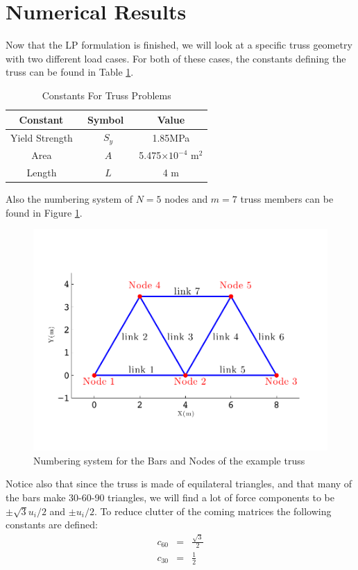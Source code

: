 \documentclass[12pt]{article}
\begin{document}
\section{Numerical Results}
Now that the LP formulation is finished, we will look at a specific truss geometry with two different load cases.  For both of these cases, the constants defining the truss can be found in Table \ref{tab:Constants}.
\begin{table}[htb!]
\caption{Constants For Truss Problems}
\label{tab:Constants}
\begin{center}
  \begin{tabular}{@{} |c|c|c| @{}}
    \hline
     Constant\ & Symbol\ & Value\\
    \hline
\hline
   Yield Strength\ & $S_y$&1.85MPa \\
\hline
  Area\ &$A$&5.475$\times10^{-4}$ m$^2$ \\
    \hline
  Length\ &$L$&4 m\\
    \hline
  \end{tabular}
\end{center}
\end{table}
Also the numbering system of $N=5$ nodes and $m=7$ truss members can be found in Figure \ref{fig:NodesBars}.
\begin{figure}[htb!]
	\begin{center}
		\includegraphics[width=1\textwidth]{TrussFSNodesBars2}
	\end{center}
	\caption{Numbering system for the Bars and Nodes of the example truss}
	\label{fig:NodesBars}
\end{figure}
Notice also that since the truss is made of equilateral triangles, and that many of the bars make 30-60-90 triangles, we will find a lot of force components to be $\pm \sqrt{3}u_i/2$ and $\pm u_i/2$.  To reduce clutter of the coming matrices the following constants are defined:
\begin{eqnarray}
c_{60} &=& \frac{\sqrt{3}}{2}\\
c_{30} &=& \frac{1}{2}
\end{eqnarray}
\end{document}

